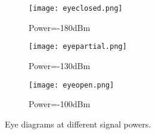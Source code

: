 \begin{figure}[H]
\centering
\begin{subfigure}{.3\linewidth}
\texttt{[image: eyeclosed.png]}
\caption{Power=-180dBm}
\end{subfigure}
\begin{subfigure}{.3\linewidth}
\texttt{[image: eyepartial.png]}
\caption{Power=-130dBm}
\end{subfigure}
\begin{subfigure}{.3\linewidth}
\texttt{[image: eyeopen.png]}
\caption{Power=-100dBm}
\end{subfigure}
\caption{Eye diagrams at different signal powers.}
\end{figure}


%
%
%
